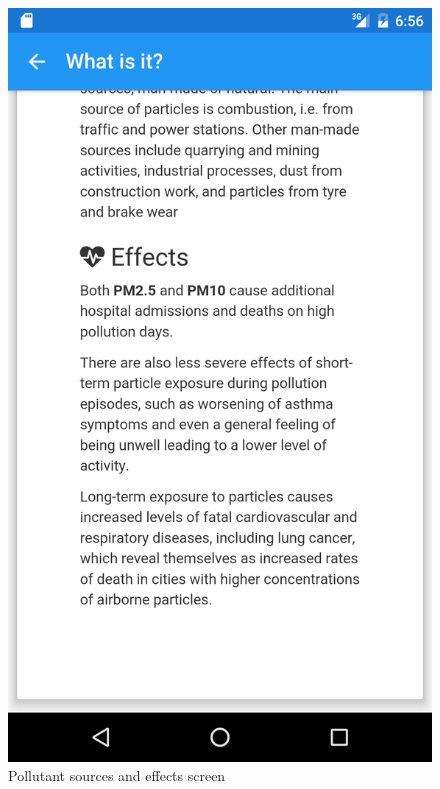 \begin{figure}[H]
\begin{adjustbox}{width=.3\textwidth,center=\textwidth}
  \centering
  \includegraphics[scale=1]{images/second_visualization_sub_screen_2.png}
\end{adjustbox}
  \caption[Pollutant sources and effects screen]{Pollutant sources and effects screen}
  \label{fig:second_visualization_sub_screen}
\end{figure}

